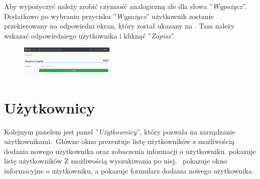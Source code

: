 Aby wypożyczyć należy zrobić czynność analogiczną ale dla słowa ''\textit{Wypożycz}''. Dodatkowo po wybraniu przycisku ''\textit{Wypożycz}'' użytkownik zostanie przekierowany na odpowiedni ekran, który został ukazany na . Tam należy wskazać odpowiedniego użytkownika i kliknąć ''\textit{Zapisz}''.

\begin{figure}[H]
    \centering
    \includegraphics[width=0.4\textwidth]{images/new}
    \label{fig:new}
\end{figure}

\section{Użytkownicy}
Kolejnym panelem jest panel ''\textit{Użytkownicy}'', który pozwala na zarządzanie użytkownikami.\ Główne okno prezentuje listę użytkowników z możliwością dodania nowego użytkownika oraz zobaczenia informacji o użytkowniku.  pokazuje listę użytkowników Z możliwością wyszukiwania po niej.\  pokazuje okno informacyjne o użytkowniku, a  pokazuje formularz dodania nowego użytkownika.

